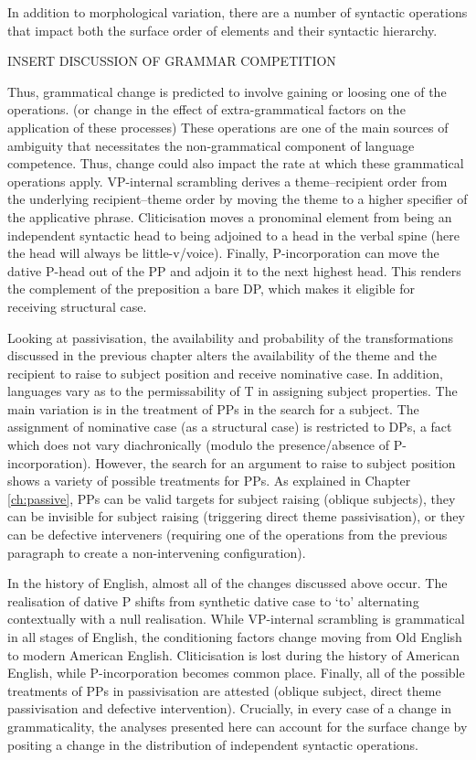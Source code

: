 	In addition to morphological variation, there are a number of syntactic operations that impact both the surface order of elements and their syntactic hierarchy.
	
	INSERT DISCUSSION OF GRAMMAR COMPETITION
	
	Thus, grammatical change is predicted to involve gaining or loosing one of the operations. (or change in the effect of extra-grammatical factors on the application of these processes) These operations are one of the main sources of ambiguity that necessitates the non-grammatical component of language competence. Thus, change could also impact the rate at which these grammatical operations apply. VP-internal scrambling derives a theme--recipient order from the underlying recipient--theme order by moving the theme to a higher specifier of the applicative phrase. Cliticisation moves a pronominal element from being an independent syntactic head to being adjoined to a head in the verbal spine (here the head will always be little-v/voice). Finally, P-incorporation can move the dative P-head out of the PP and adjoin it to the next highest head. This renders the complement of the preposition a bare DP, which makes it eligible for receiving structural case.

	Looking at passivisation, the availability and probability of the transformations discussed in the previous chapter alters the availability of the theme and the recipient to raise to subject position and receive nominative case. In addition, languages vary as to the permissability of T in assigning subject properties. The main variation is in the treatment of PPs in the search for a subject. The assignment of nominative case (as a structural case) is restricted to DPs, a fact which does not vary diachronically (modulo the presence/absence of P-incorporation). However, the search for an argument to raise to subject position shows a variety of possible treatments for PPs. As explained in Chapter \ref{ch:passive}, PPs can be valid targets for subject raising (oblique subjects), they can be invisible for subject raising (triggering direct theme passivisation), or they can be defective interveners (requiring one of the operations from the previous paragraph to create a non-intervening configuration).

	In the history of English, almost all of the changes discussed above occur. The realisation of dative P shifts from synthetic dative case to `to' alternating contextually with a null realisation. While VP-internal scrambling is grammatical in all stages of English, the conditioning factors change moving from Old English to modern American English. Cliticisation is lost during the history of American English, while P-incorporation becomes common place. Finally, all of the possible treatments of PPs in passivisation are attested (oblique subject, direct theme passivisation and defective intervention). Crucially, in every case of a change in grammaticality, the analyses presented here can account for the surface change by positing a change in the distribution of independent syntactic operations.

